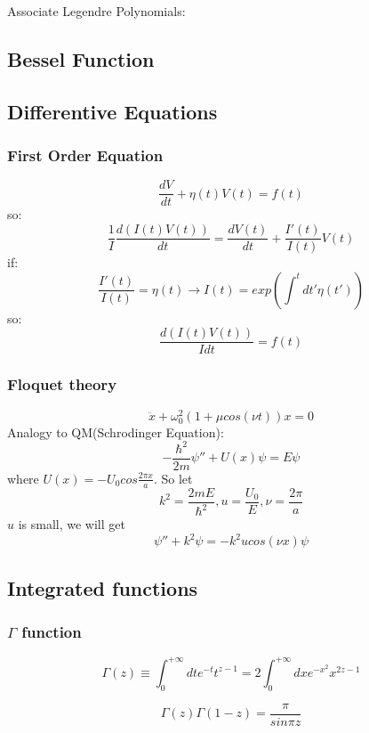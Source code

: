Associate Legendre Polynomials:

\subsection{Bessel Function}
\subsection{Differentive Equations}

\subsubsection{First Order Equation}
\[ 
\frac{dV}{dt} + \eta(t)V(t) = f(t)  
\]
so:
\[
    \frac{1}{I}\frac{d(I(t)V(t))}{dt} = \frac{dV(t)}{dt} + \frac{I'(t)}{I(t)}V(t)
    \]
if: 
\[ 
    \frac{I'(t)}{I(t)} = \eta(t)	\rightarrow I(t) = exp(\int^{t}dt'\eta(t'))
    \]
so:
\[ \frac{d(I(t)V(t))}{I dt} = f(t)\]

\subsubsection{Floquet theory}
\begin{equation}
    \ddot{x} + \omega_{0}^{2}(1+\mu cos(\nu t))x = 0
\end{equation}
Analogy to QM(Schrodinger Equation):	
\[
    -\frac{\hbar^{2}}{2m}{\psi''} + U(x)\psi = E\psi
    \]
where $U(x) = -U_{0}cos\frac{2\pi x}{a}$.
So let 
\[
    k^{2} = \frac{2mE}{\hbar^{2}}, u=\frac{U_0}{E}, \nu=\frac{2\pi}{a}
    \]
$u$ is small, we will get   
\[ 
    \psi''+k^{2}\psi = -k^{2}ucos(\nu x)\psi
    \]

\subsection{Integrated functions}
\subsubsection{$\Gamma$ function}
\[\Gamma(z) \equiv \int_{0}^{+\infty}dt e^{-t} t^{z-1} =
2\int_{0}^{+\infty}dx e^{-x^2}x^{2z-1}\]

\[\Gamma(z)\Gamma(1-z) = \frac{\pi}{sin\pi z}\]

